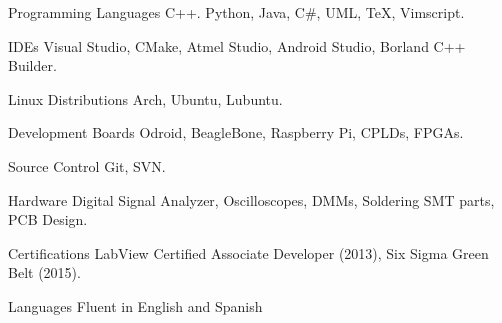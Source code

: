 
\begin{cvskills}


	\cvskill
		{Programming Languages}
			{C++. Python, Java, C\#, UML, \TeX, Vimscript.}

	\cvskill
		{IDEs}
			{Visual Studio, CMake, Atmel Studio, Android Studio, Borland C++ Builder.}

	\cvskill
		{Linux Distributions}
			{Arch, Ubuntu, Lubuntu.}

	\cvskill
		{Development Boards}
			{Odroid, BeagleBone, Raspberry Pi, CPLDs, FPGAs.}

	\cvskill
		{Source Control}
			{Git, SVN.}

	\cvskill
		{Hardware}
			{Digital Signal Analyzer, Oscilloscopes, DMMs, Soldering SMT parts, PCB Design.}

	\cvskill
		{Certifications}
			{LabView Certified Associate Developer (2013), Six Sigma Green Belt (2015).}

	\cvskill
		{Languages}
			{Fluent in English and Spanish}

\end{cvskills}
